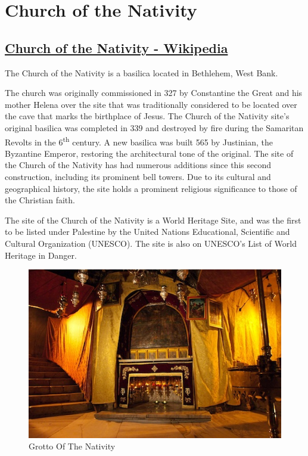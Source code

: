 \documentclass[letterpaper]{report}
\begin{document}
\clearpage
\section{Church of the Nativity}
\begin{multicols}{2}

\subsection{\href{https://en.wikipedia.org/wiki/Church_of_the_Nativity}{
Church of the Nativity - Wikipedia}}

The Church of the Nativity is a basilica located in Bethlehem, West Bank.

The church was originally commissioned in 327 by Constantine the Great and his 
mother Helena over the site that was traditionally considered to be located 
over the cave that marks the birthplace of Jesus.
The Church of the Nativity site's original basilica was completed in 339 and 
destroyed by fire during the Samaritan Revolts in the 6\textsuperscript{th} 
century.
A new basilica was built 565 by Justinian, the Byzantine Emperor,
restoring the architectural tone of the original.
The site of the Church of the Nativity has had numerous additions since this 
second construction, including its prominent bell towers.
Due to its cultural and geographical history,
the site holds a prominent religious significance to those of the Christian 
faith.

The site of the Church of the Nativity is a World Heritage Site,
and was the first to be listed under Palestine by the United Nations 
Educational,
Scientific and Cultural Organization (UNESCO).
The site is also on UNESCO's List of World Heritage in Danger.

\begin{figure}[H]
\centering
\label{fig:GrottoOfTheNativity}
\caption{Grotto Of The Nativity}
\includegraphics[width=\columnwidth]{GrottoOfTheNativity}
\end{figure}


\end{multicols}
\end{document}
